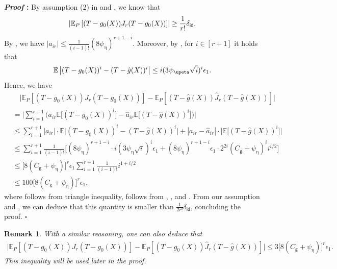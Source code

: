\documentclass{article}
\def\eps{{\epsilon}}
\newcommand{\E}{\mathbb{E}}
\newtheorem{remark}{Remark}[section]
\renewenvironment{proof}{\noindent\textbf{\textit{Proof }:}}{\hfill$\square$}
\begin{document}
\begin{proof}
    By assumption (2) in  and , we know that
    \begin{equation}
        \notag
        \left|\E_{P}\left[ (T-g_0(X))J_r(T-g_0(X)) \right]\right| \geq \frac{1}{r!} \delta_{\mathsf{id}},
    \end{equation}
    By , we have $|a_{ir}| \leq \frac{1}{(i-1)!} (8\psi_{\upeta})^{r+1-i}$. Moreover, by , for $i\in[r+1]$ it holds that
    \begin{equation}
        \notag
        \E\left|(T-g_0(X))^i - (T-\hat{g}(X))^i\right| \leq i(3\psi_{\upeta}\sqrt{i})^i\eps_1.
    \end{equation}
    Hence, we have
    \begin{align}
        &\quad \Big|\E_{P}\left[ (T-g_0(X))J_r(T-g_0(X)) \right] - \E_{P}\left[ (T-\hat{g}(X))\hat{J}_r(T-\hat{g}(X))\right]\Big| \nonumber \\
        &= \bigg| \sum_{i=1}^{r+1} \big(a_{ir} \E\big[(T-g_0(X))^{i}\big] - \hat{a}_{ir} \E\big[(T-\hat{g}(X))^{i}\big]\big) \bigg| \nonumber \\
        &\leq \sum_{i=1}^{r+1} |a_{ir}|\cdot \E\big|(T-g_0(X))^{i} - (T-\hat{g}(X))^{i}\big| + |a_{ir}-\hat{a}_{ir}|\cdot \big|\E\big[(T-\hat{g}(X))^{i}\big]\big| \label{eq:identification-3} \\
        &\leq \sum_{i=1}^{r+1} \frac{1}{(i-1)!}\big[(8\psi_{\upeta})^{r+1-i}\cdot i(3\psi_{\upeta}\sqrt{i})^i\eps_1 + (8\psi_{\upeta})^{r+1-i}\eps_1 \cdot 2^{2i}(C_{\mathsf{g}}+\psi_{\upeta})^i i^{i/2} \big] \label{eq:identification-4} \\
        &\leq \big[8(C_{\mathsf{g}} + \psi_{\upeta})\big]^{r}\eps_1 \sum_{i=1}^{r+1} \frac{1}{(i-1)!} i^{1+i/2} \nonumber\\
        &\leq 100\big[8(C_{\mathsf{g}} + \psi_{\upeta})\big]^{r}\eps_1, \nonumber
    \end{align}
    where  follows from triangle inequality,  follows from , ,  and .
    From our assumption  and , we can deduce that this quantity is smaller than $\frac{1}{2r!}\delta_{\mathsf{id}}$, concluding the proof. 
\end{proof}

\begin{remark}
    With a similar reasoning, one can also deduce that
    \begin{equation}
        \label{independent-noise-identification-alternative}
        \begin{aligned}
            \Big|\E_{P}\left[ (T-g_0(X))J_r(T-g_0(X)) \right] - \E_{P}\left[ (T-g_0(X))\hat{J}_r(T-\hat{g}(X))\right]\Big| \leq 3\big[8(C_{\mathsf{g}} + \psi_{\upeta})\big]^{r}\eps_1.
        \end{aligned}
    \end{equation}
    This inequality will be used later in the proof.
\end{remark}
\end{document}
